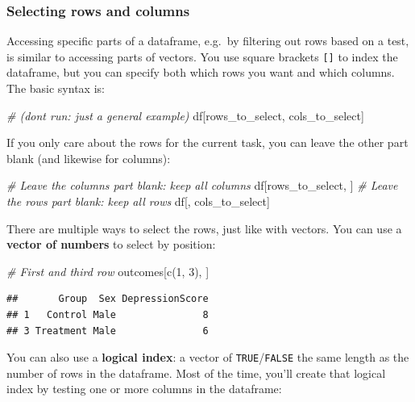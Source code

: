 \documentclass[
]{book}
\newenvironment{Shaded}{\begin{snugshade}}{\end{snugshade}}
\newcommand{\CommentTok}[1]{\textcolor[rgb]{0.56,0.35,0.01}{\textit{#1}}}
\newcommand{\DecValTok}[1]{\textcolor[rgb]{0.00,0.00,0.81}{#1}}
\newcommand{\FunctionTok}[1]{\textcolor[rgb]{0.00,0.00,0.00}{#1}}
\newcommand{\NormalTok}[1]{#1}
\begin{document}
\hypertarget{selecting-rows-and-columns}{%
\subsubsection*{Selecting rows and columns}\label{selecting-rows-and-columns}}

Accessing specific parts of a dataframe, e.g.~by filtering out rows based
on a test, is similar to accessing parts of vectors. You use square brackets
\texttt{{[}{]}} to index the dataframe, but you can specify both which rows you want
and which columns. The basic syntax is:

\begin{Shaded}
\begin{Highlighting}[]
\CommentTok{\# (don\textquotesingle{}t run: just a general example)}
\NormalTok{df[rows\_to\_select, cols\_to\_select]}
\end{Highlighting}
\end{Shaded}

If you only care about the rows for the current task, you can leave the
other part blank (and likewise for columns):

\begin{Shaded}
\begin{Highlighting}[]
\CommentTok{\# Leave the columns part blank: keep all columns }
\NormalTok{df[rows\_to\_select, ]}
\CommentTok{\# Leave the rows part blank: keep all rows}
\NormalTok{df[, cols\_to\_select]}
\end{Highlighting}
\end{Shaded}

There are multiple ways to select the rows, just like with vectors.
You can use a \textbf{vector of numbers} to select by position:

\begin{Shaded}
\begin{Highlighting}[]
\CommentTok{\# First and third row}
\NormalTok{outcomes[}\FunctionTok{c}\NormalTok{(}\DecValTok{1}\NormalTok{, }\DecValTok{3}\NormalTok{), ]}
\end{Highlighting}
\end{Shaded}

\begin{verbatim}
##       Group  Sex DepressionScore
## 1   Control Male               8
## 3 Treatment Male               6
\end{verbatim}

You can also use a \textbf{logical index}: a vector of \texttt{TRUE}/\texttt{FALSE} the same length
as the number of rows in the dataframe. Most of the time, you'll create
that logical index by testing one or more columns in the dataframe:
\end{document}
